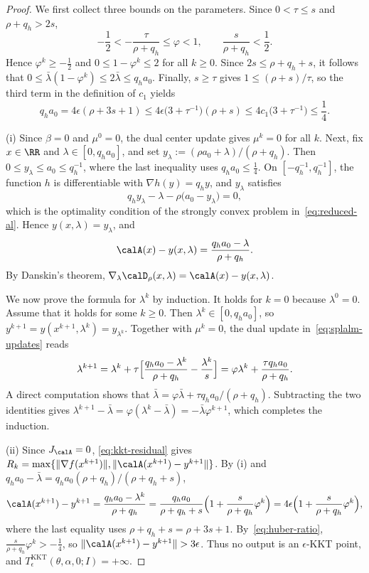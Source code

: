 \begin{proof}
We first collect three bounds on the parameters. Since \(0<\tau\le s\) and
\(\rho+q_h>2s\),
\begin{equation}
\label{eq:huber-ratio}
-\frac12<-\frac{\tau}{\rho+q_h}\le\varphi<1,
\qquad
\frac{s}{\rho+q_h}<\frac12 .
\end{equation}
Hence \(\varphi^k\ge-\frac12\) and \(0\le1-\varphi^k\le2\) for all
\(k\ge0\). Since \(2s\le\rho+q_h+s\), it follows that
\(0\le\bar\lambda(1-\varphi^k)\le2\bar\lambda\le q_ha_0\). Finally,
\(s\ge\tau\) gives \(1\le(\rho+s)/\tau\), so the third term in the
definition of \(c_1\) yields
\[
q_ha_0=4\epsilon(\rho+3s+1)
\le4\epsilon\bigl(3+\tau^{-1}\bigr)(\rho+s)
\le4c_1\bigl(3+\tau^{-1}\bigr)
\le\frac14 .
\]

(i) Since \(\beta=0\) and \(\mu^0=0\), the dual center update gives
\(\mu^k=0\) for all \(k\). Next, fix \(x\in\RR\) and
\(\lambda\in[0,q_ha_0]\), and set
\(y_\lambda:=(\rho a_0+\lambda)/(\rho+q_h)\). Then
\(0\le y_\lambda\le a_0\le q_h^{-1}\), where the last inequality uses
\(q_ha_0\le\frac14\). On \([-q_h^{-1},q_h^{-1}]\), the function \(h\) is
differentiable with \(\nabla h(y)=q_hy\), and \(y_\lambda\) satisfies
\[
q_hy_\lambda-\lambda-\rho\bigl(a_0-y_\lambda\bigr)=0,
\]
which is the optimality condition of the strongly convex problem
in~\eqref{eq:reduced-al}. Hence \(y(x,\lambda)=y_\lambda\), and
\[
\calA(x)-y(x,\lambda)=\frac{q_ha_0-\lambda}{\rho+q_h}.
\]
By Danskin's theorem,
\(\nabla_\lambda\calD_\rho(x,\lambda)=\calA(x)-y(x,\lambda)\).

We now prove the formula for \(\lambda^k\) by induction. It holds for
\(k=0\) because \(\lambda^0=0\). Assume that it holds for some \(k\ge0\).
Then \(\lambda^k\in[0,q_ha_0]\), so
\(y^{k+1}=y(x^{k+1},\lambda^k)=y_{\lambda^k}\). Together with
\(\mu^k=0\), the dual update in~\eqref{eq:splalm-updates} reads
\[
\lambda^{k+1}
=\lambda^k+\tau\Bigl[\frac{q_ha_0-\lambda^k}{\rho+q_h}
-\frac{\lambda^k}{s}\Bigr]
=\varphi\lambda^k+\frac{\tau q_ha_0}{\rho+q_h}.
\]
A direct computation shows that
\(\bar\lambda=\varphi\bar\lambda+\tau q_ha_0/(\rho+q_h)\). Subtracting the
two identities gives
\(\lambda^{k+1}-\bar\lambda=\varphi(\lambda^k-\bar\lambda)
=-\bar\lambda\varphi^{k+1}\), which completes the induction.

(ii) Since \(J_{\calA}=0\), \eqref{eq:kkt-residual} gives
\(R_k=\max\{\|\nabla f(x^{k+1})\|,\|\calA(x^{k+1})-y^{k+1}\|\}\). By (i)
and \(q_ha_0-\bar\lambda=q_ha_0(\rho+q_h)/(\rho+q_h+s)\),
\[
\calA(x^{k+1})-y^{k+1}
=\frac{q_ha_0-\lambda^k}{\rho+q_h}
=\frac{q_ha_0}{\rho+q_h+s}\Bigl(1+\frac{s}{\rho+q_h}\varphi^k\Bigr)
=4\epsilon\Bigl(1+\frac{s}{\rho+q_h}\varphi^k\Bigr),
\]
where the last equality uses \(\rho+q_h+s=\rho+3s+1\).
By~\eqref{eq:huber-ratio}, \(\frac{s}{\rho+q_h}\varphi^k>-\frac14\), so
\(\|\calA(x^{k+1})-y^{k+1}\|>3\epsilon\). Thus no output is an
\(\epsilon\)-KKT point, and
\(T^{\mathrm{KKT}}_\epsilon(\theta,\alpha,0;I)=+\infty\).
\end{proof}

